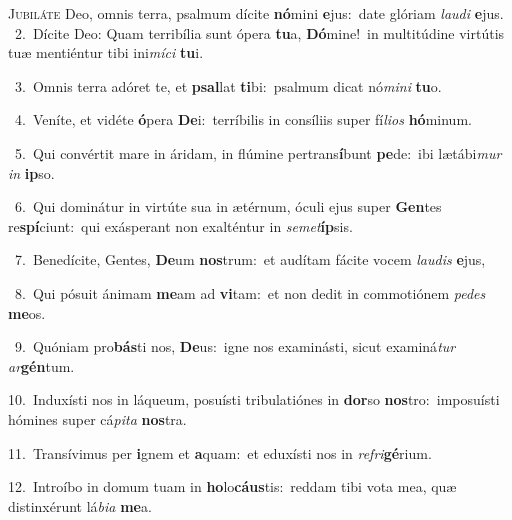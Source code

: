 \lettrine{\initial\textcolor{\initialcolor}{J}}{ubiláte} Deo, omnis terra, psalmum dícite \textbf{nó}\-mini \textbf{e}\-jus:~\star date glóriam \textit{lau}\-\textit{di} \textbf{e}\-jus.\\
{\numbfont\textcolor{\numbcolor}{~2.}}~Dícite Deo: Quam terribília sunt ópera \textbf{tu}\-a, \textbf{Dó}\-mine!~\star in multitúdine virtútis tuæ mentiéntur tibi ini\-\textit{mí}\-\textit{ci} \textbf{tu}\-i.\par
{\numbfont\textcolor{\numbcolor}{~3.}}~Omnis terra adóret te, et \textbf{psal}\-lat \textbf{ti}\-bi:~\star psalmum dicat nó\-\textit{mi}\-\textit{ni} \textbf{tu}\-o.\par
{\numbfont\textcolor{\numbcolor}{~4.}}~Veníte, et vidéte \textbf{ó}\-pera \textbf{De}\-i:~\star terríbilis in consíliis super fí\-\textit{li}\-\textit{os} \textbf{hó}\-minum.\par
{\numbfont\textcolor{\numbcolor}{~5.}}~Qui convértit mare in áridam, in flúmine pertrans\-\textbf{í}\-bunt \textbf{pe}\-de:~\star ibi lætábi\textit{mur} \textit{in} \textbf{ip}\-so.\par
{\numbfont\textcolor{\numbcolor}{~6.}}~Qui dominátur in virtúte sua in ætérnum, óculi ejus super \textbf{Gen}\-tes re\-\textbf{spí}\-ciunt:~\star qui exásperant non exalténtur in \textit{se}\-\textit{met}\textbf{íp}sis.\par
{\numbfont\textcolor{\numbcolor}{~7.}}~Benedícite, Gentes, \textbf{De}\-um \textbf{nos}\-trum:~\star et audítam fácite vocem \textit{lau}\-\textit{dis} \textbf{e}\-jus,\par
{\numbfont\textcolor{\numbcolor}{~8.}}~Qui pósuit ánimam \textbf{me}\-am ad \textbf{vi}\-tam:~\star et non dedit in commotiónem \textit{pe}\-\textit{des} \textbf{me}\-os.\par
{\numbfont\textcolor{\numbcolor}{~9.}}~Quóniam pro\-\textbf{bás}\-ti nos, \textbf{De}\-us:~\star igne nos examinásti, sicut examiná\textit{tur} \textit{ar}\-\textbf{gén}tum.\par
{\numbfont\textcolor{\numbcolor}{10.}}~Induxísti nos in láqueum, posuísti tribulatiónes in \textbf{dor}\-so \textbf{nos}\-tro:~\star imposuísti hómines super cá\-\textit{pi}\-\textit{ta} \textbf{nos}\-tra.\par
{\numbfont\textcolor{\numbcolor}{11.}}~Transívimus per \textbf{i}\-gnem et \textbf{a}\-quam:~\star et eduxísti nos in \textit{re}\-\textit{fri}\textbf{gé}rium.\par
{\numbfont\textcolor{\numbcolor}{12.}}~Introíbo in domum tuam in \textbf{ho}\-lo\-\textbf{cáus}\-tis:~\star reddam tibi vota mea, quæ distinxérunt lá\-\textit{bi}\-\textit{a} \textbf{me}\-a.\par
